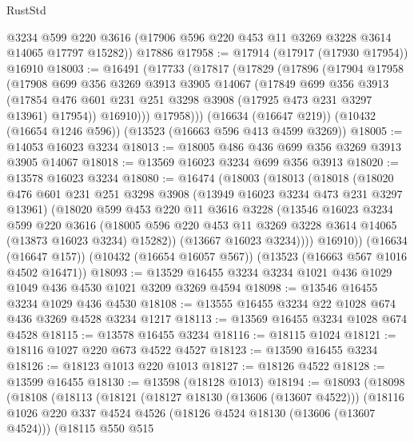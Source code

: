 \begin{lexlean}{RustStd}
\begin{coremodule}
      @3234
      @599
      @220
      @3616
      (@17906 @596 @220 @453 @11 @3269 @3228 @3614 @14065 @17797 @15282))
    @17886
@17958 := @17914 (@17917 (@17930 @17954)) @16910
@18003 := @16491
    (@17733
      (@17817
        (@17829
          (@17896
            (@17904
              @17958
              (@17908
                @699
                @356
                @3269
                @3913
                @3905
                @14067
                (@17849
                  @699
                  @356
                  @3913
                  (@17854 @476 @601 @231 @251 @3298 @3908 (@17925 @473 @231 @3297 @13961) @17954))
                @16910)))
          @17958)))
    (@16634 (@16647 @219))
    (@10432 (@16654 @1246 @596))
    (@13523 (@16663 @596 @413 @4599 @3269))
@18005 := @14053 @16023 @3234
@18013 := @18005 @486 @436 @699 @356 @3269 @3913 @3905 @14067
@18018 := @13569 @16023 @3234 @699 @356 @3913
@18020 := @13578 @16023 @3234
@18080 := @16474
    (@18003
      (@18013
        (@18018
          (@18020
            @476
            @601
            @231
            @251
            @3298
            @3908
            (@13949 @16023 @3234 @473 @231 @3297 @13961)
            (@18020
              @599
              @453
              @220
              @11
              @3616
              @3228
              (@13546
                @16023
                @3234
                @599
                @220
                @3616
                (@18005 @596 @220 @453 @11 @3269 @3228 @3614 @14065 (@13873 @16023 @3234) @15282))
              (@13667 @16023 @3234))))
        @16910))
    (@16634 (@16647 @157))
    (@10432 (@16654 @16057 @567))
    (@13523 (@16663 @567 @1016 @4502 @16471))
@18093 := @13529 @16455 @3234 @3234 @1021 @436 @1029 @1049 @436 @4530 @1021 @3209 @3269 @4594
@18098 := @13546 @16455 @3234 @1029 @436 @4530
@18108 := @13555 @16455 @3234 @22 @1028 @674 @436 @3269 @4528 @3234 @1217
@18113 := @13569 @16455 @3234 @1028 @674 @4528
@18115 := @13578 @16455 @3234
@18116 := @18115 @1024
@18121 := @18116 @1027 @220 @673 @4522 @4527
@18123 := @13590 @16455 @3234
@18126 := @18123 @1013 @220 @1013
@18127 := @18126 @4522
@18128 := @13599 @16455
@18130 := @13598 (@18128 @1013)
@18194 := @18093
    (@18098
      (@18108
        (@18113
          (@18121
            (@18127 @18130 (@13606 (@13607 @4522)))
            (@18116
              @1026
              @220
              @337
              @4524
              @4526
              (@18126 @4524 @18130 (@13606 (@13607 @4524)))
              (@18115
                @550
                @515

\end{coremodule}
\end{lexlean}
